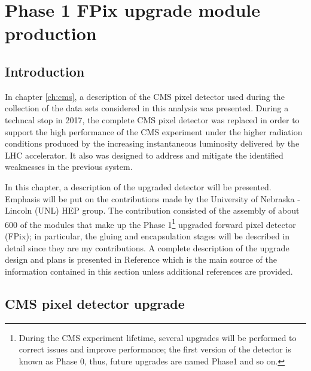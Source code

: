\chapter{Phase 1 FPix upgrade module production}\label{ch:pixel}

\section{Introduction}

In chapter \ref{ch:cms}, a description of the CMS pixel detector used during the collection of the data sets considered in this analysis was presented. During a techncal stop in 2017, the complete CMS pixel detector was replaced in order to support the high performance of the CMS experiment under the higher radiation conditions produced by the increasing instantaneous luminosity delivered  by the LHC accelerator. It also was designed to address and mitigate the identified weaknesses in the previous system.

In this chapter, a description of the upgraded detector will be presented. Emphasis will be put on the contributions made by the University of Nebraska - Lincoln (UNL) HEP group. The contribution consisted of the assembly of about 600 of the modules that make up the Phase 1\footnote{During the CMS experiment lifetime, several upgrades will be performed to correct issues and improve performance; the first version of the detector is known as Phase 0, thus, future upgrades are named Phase1 and so on.} upgraded forward pixel detector (FPix); in particular, the gluing and encapsulation stages will be described in detail since they are my contributions. A complete description of the upgrade design and plans is presented in Reference \cite{pix_tdr} which is the main source of the information contained in this section unless additional references are provided.   

\section{CMS pixel detector upgrade}

